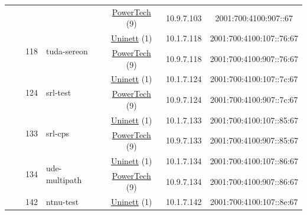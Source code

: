 \begin{small}
\begin{center}
\begin{longtable}{|c|c|c|c|c|c|c|c|}
  &  & \multicolumn{2}{|c|}{} & \multicolumn{2}{|c|}{\tiny{\href{http://www.powertech.no}{PowerTech} (9)}} & \tiny{10.9.7.103} & \tiny{2001:700:4100:907::67} \\* \cline{3-3}\cline{4-4}\cline{5-5}\cline{6-6}\cline{7-7}\cline{8-8}
  &  & \multirow{2}{*}{\tiny{118}} & \multicolumn{1}{|l|}{\multirow{2}{*}{\tiny{tuda-sereon}}} & \multicolumn{2}{|c|}{\tiny{\href{https://www.uninett.no}{Uninett} (1)}} & \tiny{10.1.7.118} & \tiny{2001:700:4100:107::76:67} \\* \cline{5-5}\cline{6-6}\cline{7-7}\cline{8-8}
  &  &  &  & \multicolumn{2}{|c|}{\tiny{\href{http://www.powertech.no}{PowerTech} (9)}} & \tiny{10.9.7.118} & \tiny{2001:700:4100:907::76:67} \\* \cline{3-3}\cline{4-4}\cline{5-5}\cline{6-6}\cline{7-7}\cline{8-8}
  &  & \multirow{2}{*}{\tiny{124}} & \multicolumn{1}{|l|}{\multirow{2}{*}{\tiny{srl-test}}} & \multicolumn{2}{|c|}{\tiny{\href{https://www.uninett.no}{Uninett} (1)}} & \tiny{10.1.7.124} & \tiny{2001:700:4100:107::7c:67} \\* \cline{5-5}\cline{6-6}\cline{7-7}\cline{8-8}
  &  &  &  & \multicolumn{2}{|c|}{\tiny{\href{http://www.powertech.no}{PowerTech} (9)}} & \tiny{10.9.7.124} & \tiny{2001:700:4100:907::7c:67} \\* \cline{3-3}\cline{4-4}\cline{5-5}\cline{6-6}\cline{7-7}\cline{8-8}
  &  & \multirow{2}{*}{\tiny{133}} & \multicolumn{1}{|l|}{\multirow{2}{*}{\tiny{srl-cps}}} & \multicolumn{2}{|c|}{\tiny{\href{https://www.uninett.no}{Uninett} (1)}} & \tiny{10.1.7.133} & \tiny{2001:700:4100:107::85:67} \\* \cline{5-5}\cline{6-6}\cline{7-7}\cline{8-8}
  &  &  &  & \multicolumn{2}{|c|}{\tiny{\href{http://www.powertech.no}{PowerTech} (9)}} & \tiny{10.9.7.133} & \tiny{2001:700:4100:907::85:67} \\* \cline{3-3}\cline{4-4}\cline{5-5}\cline{6-6}\cline{7-7}\cline{8-8}
  &  & \multirow{2}{*}{\tiny{134}} & \multicolumn{1}{|l|}{\multirow{2}{*}{\tiny{ude-multipath}}} & \multicolumn{2}{|c|}{\tiny{\href{https://www.uninett.no}{Uninett} (1)}} & \tiny{10.1.7.134} & \tiny{2001:700:4100:107::86:67} \\* \cline{5-5}\cline{6-6}\cline{7-7}\cline{8-8}
  &  &  &  & \multicolumn{2}{|c|}{\tiny{\href{http://www.powertech.no}{PowerTech} (9)}} & \tiny{10.9.7.134} & \tiny{2001:700:4100:907::86:67} \\* \cline{3-3}\cline{4-4}\cline{5-5}\cline{6-6}\cline{7-7}\cline{8-8}
  &  & \multirow{2}{*}{\tiny{142}} & \multicolumn{1}{|l|}{\multirow{2}{*}{\tiny{ntnu-test}}} & \multicolumn{2}{|c|}{\tiny{\href{https://www.uninett.no}{Uninett} (1)}} & \tiny{10.1.7.142} & \tiny{2001:700:4100:107::8e:67} \\* \cline{5-5}\cline{6-6}\cline{7-7}\cline{8-8}

\end{longtable}
\end{center}
\end{small}
